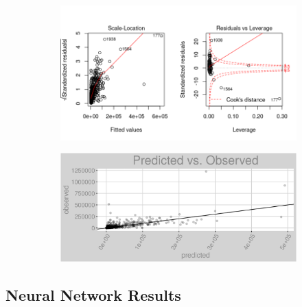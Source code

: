 \begin{figure}[h]
\centering
\begin{subfigure}{1\textwidth}
\centering
\includegraphics[width=.99\textwidth, height=0.475\textheight]{Images/natural_gas_pls_res_2.png}
\end{subfigure}
\begin{subfigure}{1\textwidth}
\centering
\includegraphics[width=.99\textwidth, height=0.3\textheight]{Images/natural_gas_pls_pvo.png}
\end{subfigure}
\end{figure}
\FloatBarrier
\newpage
\subsection{Neural Network Results}
